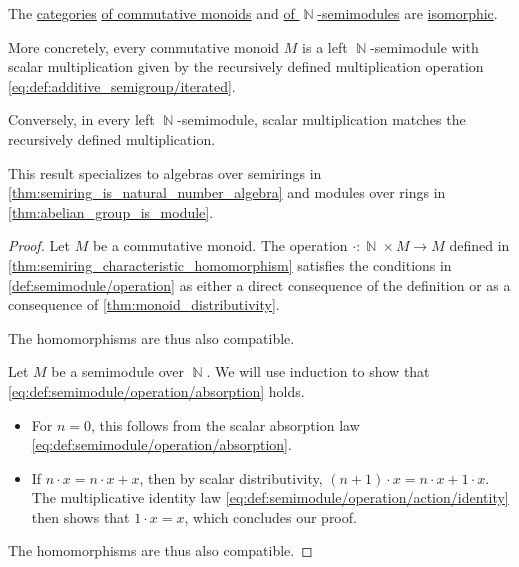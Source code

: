 \begin{proposition}\label{thm:commutative_monoid_is_semimodule}
  The \hyperref[def:category]{categories} \hyperref[def:monoid/category]{of commutative monoids} and \hyperref[def:semimodule/category]{of \( \BbbN \)-semimodules} are \hyperref[def:isomorphism_of_categories]{isomorphic}.

  More concretely, every commutative monoid \( M \) is a left \( \BbbN \)-semimodule with scalar multiplication given by the recursively defined multiplication operation \eqref{eq:def:additive_semigroup/iterated}.

  Conversely, in every left \( \BbbN \)-semimodule, scalar multiplication matches the recursively defined multiplication.
\end{proposition}
\begin{comments}
  \item This result specializes to algebras over semirings in \cref{thm:semiring_is_natural_number_algebra} and modules over rings in \cref{thm:abelian_group_is_module}.
\end{comments}
\begin{proof}
  \SufficiencySubProof Let \( M \) be a commutative monoid. The operation \( \cdot: \BbbN \times M \to M \) defined in \cref{thm:semiring_characteristic_homomorphism} satisfies the conditions in \cref{def:semimodule/operation} as either a direct consequence of the definition or as a consequence of \cref{thm:monoid_distributivity}.

  The homomorphisms are thus also compatible.

  \NecessitySubProof Let \( M \) be a semimodule over \( \BbbN \). We will use induction to show that \eqref{eq:def:semimodule/operation/absorption} holds.
  \begin{itemize}
    \item For \( n = 0 \), this follows from the scalar absorption law \eqref{eq:def:semimodule/operation/absorption}.
    \item If \( n \cdot x = n \cdot x + x \), then by scalar distributivity, \( (n + 1) \cdot x = n \cdot x + 1 \cdot x \). The multiplicative identity law \eqref{eq:def:semimodule/operation/action/identity} then shows that \( 1 \cdot x = x \), which concludes our proof.
  \end{itemize}

  The homomorphisms are thus also compatible.
\end{proof}


